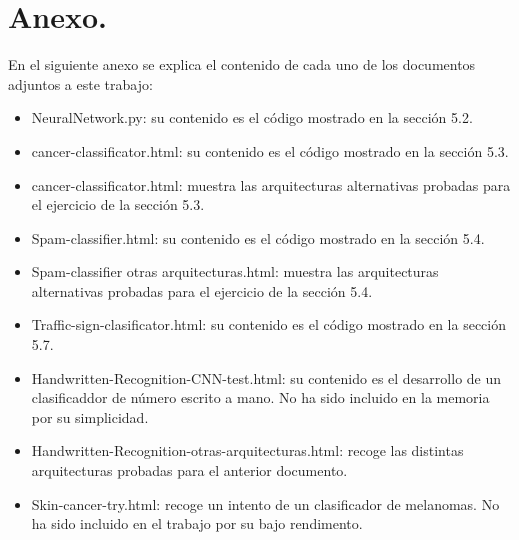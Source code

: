 \documentclass[a4paper,11pt]{article}
\begin{document}
\section*{Anexo.}
En el siguiente anexo se explica el contenido de cada uno de los documentos adjuntos a este trabajo:
\begin{itemize}
\item NeuralNetwork.py: su contenido es el código mostrado en la sección 5.2.
\item cancer-classificator.html: su contenido es el código mostrado en la sección 5.3.
\item cancer-classificator.html: muestra las arquitecturas alternativas probadas para el ejercicio de la sección 5.3.
\item Spam-classifier.html: su contenido es el código mostrado en la sección 5.4.
\item Spam-classifier otras arquitecturas.html: muestra las arquitecturas alternativas probadas para el ejercicio de la sección 5.4.
\item Traffic-sign-clasificator.html: su contenido es el código mostrado en la sección 5.7.
\item Handwritten-Recognition-CNN-test.html: su contenido es el desarrollo de un clasificaddor de número escrito a mano. No ha sido incluido en la memoria por su simplicidad.
\item Handwritten-Recognition-otras-arquitecturas.html: recoge las distintas arquitecturas probadas para el anterior documento.
\item Skin-cancer-try.html: recoge un intento de un clasificador de melanomas. No ha sido incluido en el trabajo por su bajo rendimento.


\end{itemize}
\end{document}
